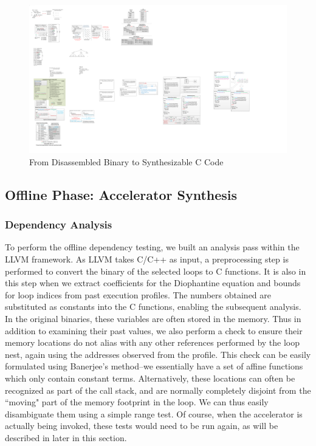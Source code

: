 \begin{figure}[htp]
\begin{center}
\includegraphics[width=0.87\linewidth]{chap6fig/analysisSteps.pdf}
\caption{From Disassembled Binary to Synthesizable C Code
\label{fig:mainSteps}}
\end{center}
\end{figure}


\subsection{Offline Phase: Accelerator Synthesis}

\subsubsection{Dependency Analysis}
To perform the offline dependency testing, we built an analysis pass within the LLVM framework. As LLVM takes C/C++ as input, a preprocessing step is performed
to convert the binary of the selected loops to C functions. It is also in this step when we extract coefficients for the Diophantine equation and bounds for loop indices from past execution profiles.
The numbers obtained are substituted as constants into the C functions, enabling the subsequent analysis. 
In the original binaries, these variables are often stored in the memory. 
Thus in addition to examining their past values, we also perform a check to ensure their memory locations do not alias with any other references performed by the loop nest, again using the addresses observed from the profile. This check can be easily formulated using Banerjee's method--we essentially have a set of affine
functions which only contain constant terms. Alternatively, these locations can often be
recognized as part of the call stack, and are normally completely disjoint from
the ``moving" part of the memory footprint in the loop. We can thus easily disambiguate them using a simple
range test. Of course, when the accelerator is actually being invoked, these tests would need to be run again, as will be described in later in this section.


